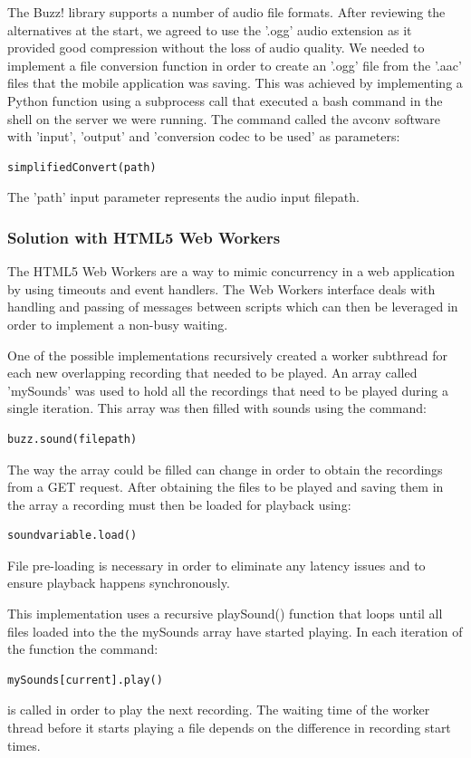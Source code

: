 \documentclass{l3proj}
\begin{document}
The Buzz! library supports a number of audio file formats. After reviewing the alternatives at the start, we agreed to use the '.ogg' audio extension as it provided good compression without the loss of audio quality. We needed to implement a file conversion function in order to create an '.ogg' file from the '.aac' files that the mobile application was saving. This was achieved by implementing a \gls{Python} function using a subprocess call that executed a bash command in the shell on the server we were running. The command called the avconv software with 'input', 'output' and 'conversion codec to be used' as parameters:

\begin{verbatim}
simplifiedConvert(path)
\end{verbatim}

The 'path' input parameter represents the audio input filepath.

\subsubsection{Solution with HTML5 Web Workers}
The HTML5 Web Workers are a way to mimic concurrency in a web application by using timeouts and event handlers. The Web Workers interface deals with handling and passing of messages between scripts which can then be leveraged in order to implement a non-busy waiting.

One of the possible implementations recursively created a worker subthread for each new overlapping recording that needed to be played.  An array called 'mySounds' was used to hold all the recordings that need to be played during a single iteration. This array was then filled with sounds using the command:
\begin{verbatim}
buzz.sound(filepath)
\end{verbatim}
The way the array could be filled can change in order to obtain the recordings from a GET request. After obtaining the files to be played and saving them in the array a recording must then be loaded for playback using:
\begin{verbatim}
soundvariable.load()
\end{verbatim}
File pre-loading is necessary in order to eliminate any latency issues and to ensure playback happens synchronously.

This implementation uses a recursive playSound() function that loops until all files loaded into the the mySounds array have started playing. In each iteration of the function the command:
\begin{verbatim}
mySounds[current].play()
\end{verbatim}
is called in order to play the next recording. The waiting time of the worker thread before it starts playing a file depends on the difference in recording start times.
\end{document}
